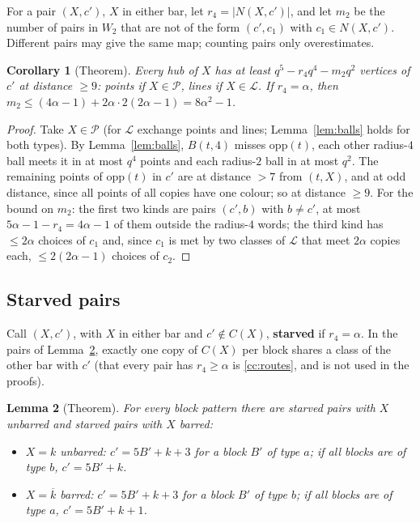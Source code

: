 \documentclass[11pt]{amsart}
\theoremstyle{plain}
\newtheorem{lemma}{Lemma}[section]
\newtheorem{corollary}[lemma]{Corollary}
\theoremstyle{definition}
\theoremstyle{remark}
\newcommand{\opp}{\mathrm{opp}}
\newcommand{\cP}{\mathcal{P}}
\newcommand{\cL}{\mathcal{L}}
\newcommand{\bk}[1]{\overline{#1}}
\begin{document}
For a pair $(X, c')$, $X$ in either bar, let $r_4 = |N(X,c')|$, and let $m_2$ be the number of pairs in $W_2$ that are
not of the form $(c', c_1)$ with $c_1 \in N(X,c')$. Different pairs may give the same map; counting pairs only
overestimates.

\begin{corollary}[Theorem]\label{cor:count}
Every hub of $X$ has at least $q^5 - r_4q^4 - m_2q^2$ vertices of $c'$ at distance $\ge 9$: points if $X \in \cP$, lines
if $X \in \cL$. If $r_4 = \alpha$, then $m_2 \le (4\alpha - 1) + 2\alpha \cdot 2(2\alpha - 1) = 8\alpha^2 - 1$.
\end{corollary}

\begin{proof}
Take $X \in \cP$ (for $\cL$ exchange points and lines; Lemma~\ref{lem:balls} holds for both types). By
Lemma~\ref{lem:balls}, $B(t,4)$ misses $\opp(t)$, each other radius-$4$ ball meets it in at most $q^4$ points and
each radius-$2$ ball in at most $q^2$. The remaining points of $\opp(t)$ in $c'$ are at distance $> 7$ from $(t,X)$, and
at odd distance, since all points of all copies have one colour; so at distance $\ge 9$. For the bound on $m_2$: the
first two kinds are pairs $(c', b)$ with $b \ne c'$, at most $5\alpha - 1 - r_4 = 4\alpha - 1$ of them outside the
radius-$4$ words; the third kind has $\le 2\alpha$ choices of $c_1$ and, since $c_1$ is met by two classes of $\cL$ that
meet $2\alpha$ copies each, $\le 2(2\alpha - 1)$ choices of $c_2$.
\end{proof}

\subsection{Starved pairs}
Call $(X, c')$, with $X$ in either bar and $c' \notin C(X)$, \textbf{starved} if $r_4 = \alpha$. In the pairs of
Lemma~\ref{lem:starved}, exactly one copy of $C(X)$ per block shares a class of the other bar with $c'$ (that every pair
has $r_4 \ge \alpha$ is \ref{cc:routes}, and is not used in the proofs).

\begin{lemma}[Theorem]\label{lem:starved}
For every block pattern there are starved pairs with $X$ unbarred and starved pairs with $X$ barred:
\begin{itemize}[leftmargin=1.5em]
\item $X = k$ unbarred: $c' = 5B' + k + 3$ for a block $B'$ of type $a$; if all blocks are of type $b$, $c' = 5B' + k$.
\item $X = \bk k$ barred: $c' = 5B' + k + 3$ for a block $B'$ of type $b$; if all blocks are of type $a$,
  $c' = 5B' + k + 1$.
\end{itemize}
\end{lemma}
\end{document}
